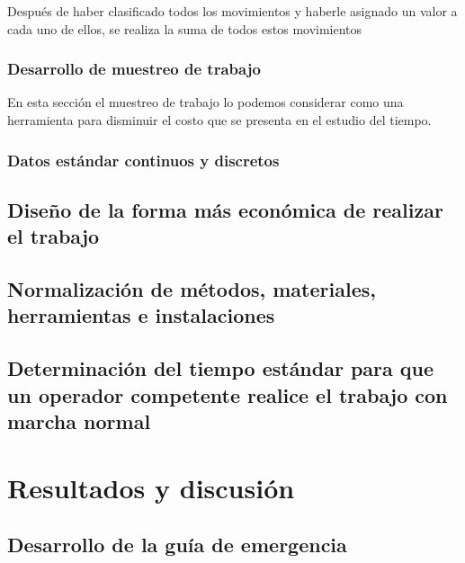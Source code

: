     Después de haber clasificado todos los movimientos y haberle asignado un valor a cada uno de ellos, se realiza la suma de todos estos movimientos
        
    \subsubsection{Desarrollo de muestreo de trabajo}
    En esta sección el muestreo de trabajo lo podemos considerar como una herramienta para disminuir el costo que se presenta en el estudio del tiempo. 
    
    \subsubsection{Datos estándar continuos y discretos}
    \subsection{Diseño de la forma más económica de realizar el trabajo}
    \subsection{Normalización de métodos, materiales, herramientas e instalaciones}
    \subsection{Determinación del tiempo estándar para que un operador competente realice el trabajo con marcha normal}
    
    
    
    
    

    


    
    \section{Resultados y discusión}
    \subsection{Desarrollo de la guía de emergencia}
    
